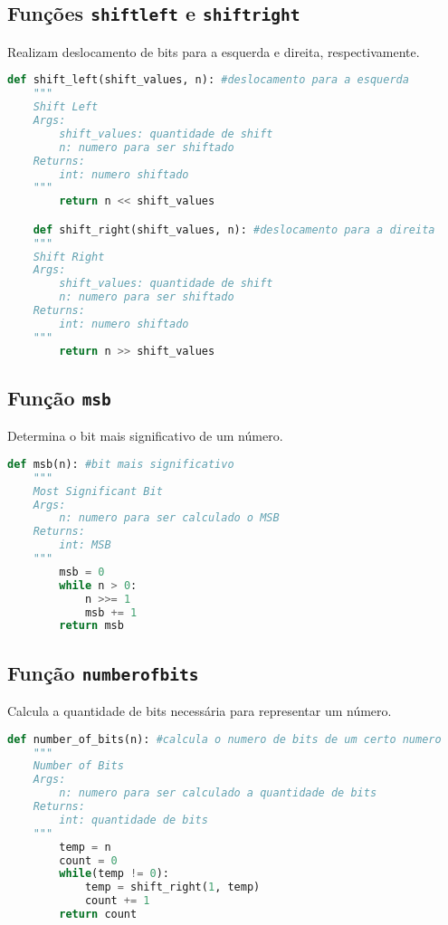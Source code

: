 \documentclass{article}
\begin{document}
\subsection{Funções \texttt{shift\textunderscore left} e \texttt{shift\textunderscore right}}
Realizam deslocamento de bits para a esquerda e direita, respectivamente.

\begin{lstlisting}[language=Python]
    def shift_left(shift_values, n): #deslocamento para a esquerda
    """
    Shift Left
    Args:
        shift_values: quantidade de shift
        n: numero para ser shiftado
    Returns:
        int: numero shiftado
    """
        return n << shift_values

    def shift_right(shift_values, n): #deslocamento para a direita
    """
    Shift Right
    Args:
        shift_values: quantidade de shift
        n: numero para ser shiftado
    Returns:
        int: numero shiftado
    """
        return n >> shift_values
    \end{lstlisting}

\subsection{Função \texttt{msb}}
Determina o bit mais significativo de um número.

\begin{lstlisting}[language=Python]
    def msb(n): #bit mais significativo
    """
    Most Significant Bit
    Args:
        n: numero para ser calculado o MSB
    Returns:
        int: MSB
    """
        msb = 0
        while n > 0:
            n >>= 1
            msb += 1
        return msb
    \end{lstlisting}

\subsection{Função \texttt{number\textunderscore of\textunderscore bits}}
Calcula a quantidade de bits necessária para representar um número.

\begin{lstlisting}[language=Python]
    def number_of_bits(n): #calcula o numero de bits de um certo numero
    """
    Number of Bits
    Args:
        n: numero para ser calculado a quantidade de bits
    Returns:
        int: quantidade de bits
    """
        temp = n
        count = 0
        while(temp != 0):
            temp = shift_right(1, temp)
            count += 1
        return count
    \end{lstlisting}
\end{document}

